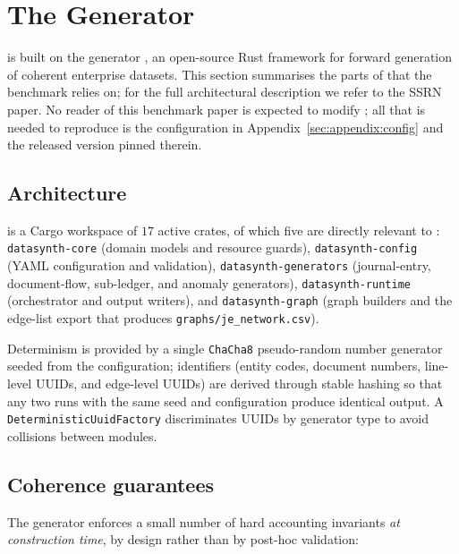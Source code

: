 \section{The \system{} Generator}
\label{sec:datasynth}

\bench{} is built on the \system{} generator
\citep{ivertowski2026datasynth,datasynth-repo}, an open-source Rust
framework for forward generation of coherent enterprise datasets.
This section summarises the parts of \system{} that the benchmark
relies on; for the full architectural description we refer to the
SSRN paper.  No reader of this benchmark paper is expected to
modify \system{}; all that is needed to reproduce \bench{} is the
configuration in Appendix~\ref{sec:appendix:config} and the released
\system{} version pinned therein.

\subsection{Architecture}
\label{sec:datasynth:arch}

\system{} is a Cargo workspace of $17$ active crates, of which
five are directly relevant to \bench{}: \texttt{datasynth-core}
(domain models and resource guards), \texttt{datasynth-config}
(YAML configuration and validation), \texttt{datasynth-generators}
(journal-entry, document-flow, sub-ledger, and anomaly generators),
\texttt{datasynth-runtime} (orchestrator and output writers), and
\texttt{datasynth-graph} (graph builders and the edge-list export
that produces \texttt{graphs/je\_network.csv}).

Determinism is provided by a single \texttt{ChaCha8} pseudo-random
number generator seeded from the configuration; identifiers (entity
codes, document numbers, line-level UUIDs, and edge-level UUIDs) are
derived through stable hashing so that any two runs with the same
seed and configuration produce identical output.  A
\texttt{DeterministicUuidFactory} discriminates UUIDs by generator
type to avoid collisions between modules.

\subsection{Coherence guarantees}
\label{sec:datasynth:coherence}

The generator enforces a small number of hard accounting invariants
\emph{at construction time}, by design rather than by post-hoc
validation:

